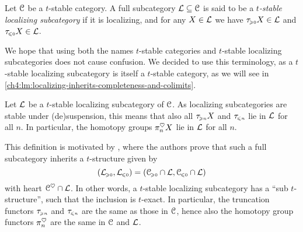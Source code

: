 \begin{definition}
    \label{ch4:def:t-stable-localizing-subcategory}
    Let $\EuScript{C}$ be a $t$-stable category. A full subcategory $\mathcal{L}\subseteq \EuScript{C}$ is said to be a \emph{$t$-stable localizing subcategory} if it is localizing, and for any $X\in \mathcal{L}$ we have $\tau_{\hspace{-1pt}\scriptscriptstyle\geqslant 0} X\in \mathcal{L}$ and $\tau_{\hspace{-1pt}\scriptscriptstyle\leqslant 0} X\in \mathcal{L}$. 
\end{definition}

\begin{remark}
    We hope that using both the names $t$-stable categories and $t$-stable localizing subcategories does not cause confusion. We decided to use this terminology, as a $t$-stable localizing subcategory is itself a $t$-stable category, as we will see in \cref{ch4:lm:localizing-inherits-completeness-and-colimits}. 
\end{remark}

\begin{remark}
    Let $\mathcal{L}$ be a $t$-stable localizing subcategory of $\EuScript{C}$. As localizing subcategories are stable under (de)suspension, this means that also all $\tau_{\hspace{-1pt}\scriptscriptstyle\geqslant n} X$ and $\tau_{\hspace{-1pt}\scriptscriptstyle\leqslant n}$ lie in $\mathcal{L}$ for all $n$. In particular, the homotopy groups $\pi_n^\heartsuit X$ lie in $\mathcal{L}$ for all $n$. 
\end{remark}

\begin{remark}
    \label{ch4:rm:t-stable-truncation-homotopy-the-same-functors}
    This definition is motivated by \cite[1.3.19]{beilinson-bernstein-deligne_1983}, where the authors prove that such a full subcategory inherits a $t$-structure given by 
    \[(\mathcal{L}_{\hspace{-1pt}\scriptscriptstyle\geqslant 0}, \mathcal{L}_{\hspace{-1pt}\scriptscriptstyle\leqslant 0}) = (\EuScript{C}_{\hspace{-1pt}\scriptscriptstyle\geqslant 0}\cap \mathcal{L}, \EuScript{C}_{\hspace{-1pt}\scriptscriptstyle\leqslant 0}\cap \mathcal{L})\]
    with heart $\EuScript{C}^\heartsuit\cap \mathcal{L}$. In other words, a $t$-stable localizing subcategory has a ``sub $t$-structure'', such that the inclusion is $t$-exact. In particular, the truncation functors $\tau_{\hspace{-1pt}\scriptscriptstyle\geqslant n}$ and $\tau_{\hspace{-1pt}\scriptscriptstyle\leqslant n}$ are the same as those in $\EuScript{C}$, hence also the homotopy group functors $\pi_n^\heartsuit$ are the same in $\EuScript{C}$ and $\mathcal{L}$. 
\end{remark}



